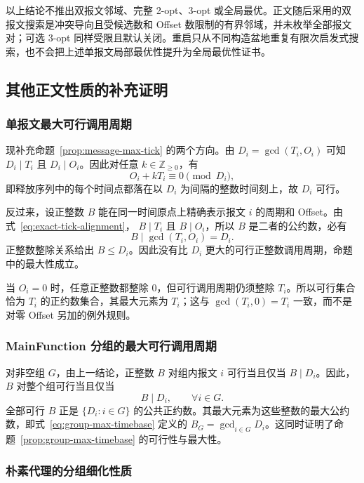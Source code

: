 \documentclass[UTF8,a4paper,twoside,zihao=-4]{ctexart}
\numberwithin{equation}{section}
\numberwithin{figure}{section}
\numberwithin{table}{section}
\theoremstyle{definition}
\numberwithin{algocf}{section}
\begin{document}
以上结论不推出双报文邻域、完整 2-opt、3-opt 或全局最优。正文随后采用的双报文搜索是冲突导向且受候选数和 Offset 数限制的有界邻域，并未枚举全部报文对；可选 3-opt 同样受限且默认关闭。重启只从不同构造盆地重复有限次启发式搜索，也不会把上述单报文局部最优性提升为全局最优性证书。

\subsection{其他正文性质的补充证明}
\label{subsec:appendix-mainfunction-proof}

\subsubsection{单报文最大可行调用周期}
\label{subsubsec:appendix-message-tick-proof}

现补充命题~\ref{prop:message-max-tick} 的两个方向。由
$D_i=\gcd(T_i,O_i)$ 可知 $D_i\mid T_i$ 且 $D_i\mid O_i$。因此对任意
$k\in\mathbb Z_{\ge 0}$，有
\[
 O_i+kT_i\equiv 0\pmod {D_i},
\]
即释放序列中的每个时间点都落在以 $D_i$ 为间隔的整数时间刻上，故 $D_i$ 可行。

反过来，设正整数 $B$ 能在同一时间原点上精确表示报文 $i$ 的周期和 Offset。由式~\eqref{eq:exact-tick-alignment}，
$B\mid T_i$ 且 $B\mid O_i$，所以 $B$ 是二者的公约数，必有
\[
 B\mid\gcd(T_i,O_i)=D_i.
\]
正整数整除关系给出 $B\le D_i$。因此没有比 $D_i$ 更大的可行正整数调用周期，命题中的最大性成立。

当 $O_i=0$ 时，任意正整数都整除 $0$，但可行调用周期仍须整除 $T_i$。所以可行集合恰为 $T_i$ 的正约数集合，其最大元素为 $T_i$；这与 $\gcd(T_i,0)=T_i$ 一致，而不是对零 Offset 另加的例外规则。

\subsubsection{MainFunction 分组的最大可行调用周期}
\label{subsubsec:appendix-group-timebase-proof}

对非空组 $G$，由上一结论，正整数 $B$ 对组内报文 $i$ 可行当且仅当
$B\mid D_i$。因此，$B$ 对整个组可行当且仅当
\[
 B\mid D_i,\qquad \forall i\in G.
\]
全部可行 $B$ 正是 $\{D_i:i\in G\}$ 的公共正约数。其最大元素为这些整数的最大公约数，即式~\eqref{eq:group-max-timebase} 定义的
$B_G=\gcd_{i\in G}D_i$。这同时证明了命题~\ref{prop:group-max-timebase} 的可行性与最大性。

\subsubsection{朴素代理的分组细化性质}
\label{subsubsec:appendix-naive-proxy-proof}
\end{document}
